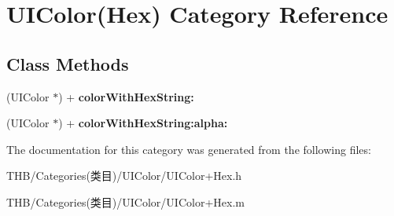 \hypertarget{category_u_i_color_07_hex_08}{}\section{U\+I\+Color(Hex) Category Reference}
\label{category_u_i_color_07_hex_08}
\subsection*{Class Methods}
\begin{DoxyCompactItemize}
\item 
\mbox{\label{category_u_i_color_07_hex_08_ae687f69d612d4eafbdb037818cb920b7}} 
(U\+I\+Color $\ast$) + {\bfseries color\+With\+Hex\+String\+:}
\item 
\mbox{\label{category_u_i_color_07_hex_08_a3b81b14a98d3455bb321f4fa73ce4f0d}} 
(U\+I\+Color $\ast$) + {\bfseries color\+With\+Hex\+String\+:alpha\+:}
\end{DoxyCompactItemize}


The documentation for this category was generated from the following files\+:\begin{DoxyCompactItemize}
\item 
T\+H\+B/\+Categories(类目)/\+U\+I\+Color/U\+I\+Color+\+Hex.\+h\item 
T\+H\+B/\+Categories(类目)/\+U\+I\+Color/U\+I\+Color+\+Hex.\+m\end{DoxyCompactItemize}
